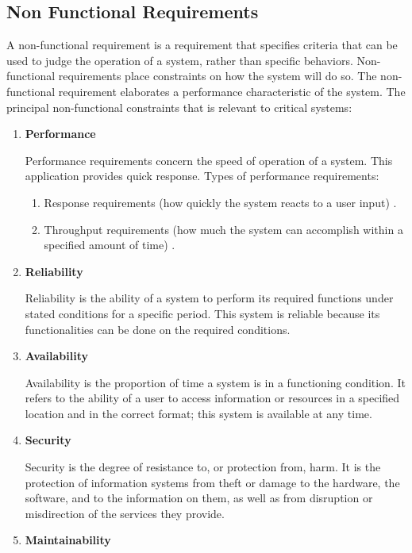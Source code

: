 \subsection{Non Functional Requirements}
A non-functional requirement is a requirement that specifies criteria that can be used to judge the operation of a system, rather than specific behaviors. Non-functional requirements place constraints on how the system will do so. The non-functional requirement elaborates a performance characteristic of the system. The principal non-functional constraints that is relevant to critical systems: 

\begin{enumerate}
\item {\bf Performance}

Performance requirements concern the speed of operation of a system. This application provides quick response. Types of performance requirements: 
\begin{enumerate}
\item Response requirements (how quickly the system reacts to a user input) .
\item Throughput requirements (how much the system can accomplish within a specified amount of time) .

\end{enumerate}

\item {\bf Reliability}

Reliability is the ability of a system to perform its required functions under stated conditions for a specific period. This system is reliable because its functionalities can be done on the required conditions. 

\item {\bf Availability }

Availability is the proportion of time a system is in a functioning condition. It refers to the ability of a user to access information or resources in a specified location and in the correct format; this system is available at any time.

\item {\bf Security}

Security is the degree of resistance to, or protection from, harm. It is the protection of information systems from theft or damage to the hardware, the software, and to the information on them, as well as from disruption or misdirection of the services they provide. 

\item {\bf Maintainability }


\end{enumerate}
